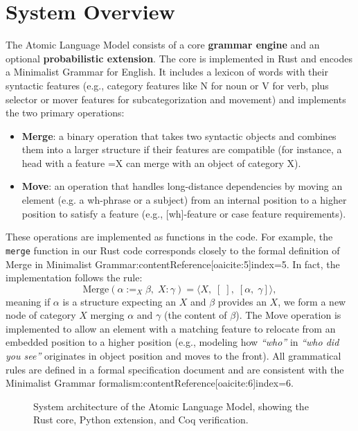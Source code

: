 \documentclass[11pt]{article}
\begin{document}
\section{System Overview}
The Atomic Language Model consists of a core \textbf{grammar engine} and an optional \textbf{probabilistic extension}. The core is implemented in Rust and encodes a Minimalist Grammar for English. It includes a lexicon of words with their syntactic features (e.g., category features like N for noun or V for verb, plus selector or mover features for subcategorization and movement) and implements the two primary operations:
\begin{itemize}\itemsep0em 
    \item \textbf{Merge}: a binary operation that takes two syntactic objects and combines them into a larger structure if their features are compatible (for instance, a head with a feature =X can merge with an object of category X).
    \item \textbf{Move}: an operation that handles long-distance dependencies by moving an element (e.g. a wh-phrase or a subject) from an internal position to a higher position to satisfy a feature (e.g., [wh]-feature or case feature requirements).
\end{itemize}
These operations are implemented as functions in the code. For example, the \texttt{merge} function in our Rust code corresponds closely to the formal definition of Merge in Minimalist Grammar:contentReference[oaicite:5]{index=5}. In fact, the implementation follows the rule:
\[ \text{Merge}(\alpha :=_X \beta,\; X:\gamma) = \langle X,\; [\;],\; [\alpha,\; \gamma]\rangle, \]
meaning if $\alpha$ is a structure expecting an $X$ and $\beta$ provides an $X$, we form a new node of category $X$ merging $\alpha$ and $\gamma$ (the content of $\beta$). The Move operation is implemented to allow an element with a matching feature to relocate from an embedded position to a higher position (e.g., modeling how \emph{\textquotedblleft who\textquotedblright} in \emph{\textquotedblleft who did you see\textquotedblright} originates in object position and moves to the front). All grammatical rules are defined in a formal specification document and are consistent with the Minimalist Grammar formalism:contentReference[oaicite:6]{index=6}.

\begin{figure}[h!]
\centering
{}
\caption{System architecture of the Atomic Language Model, showing the Rust core, Python extension, and Coq verification.}
\label{fig:architecture}
\end{figure}
\end{document}
